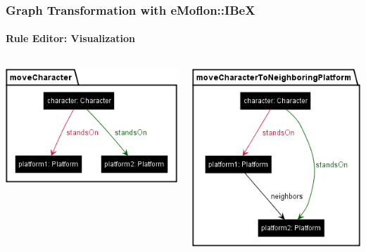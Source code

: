 	\begin{frame}
		\frametitle{Graph Transformation with eMoflon::IBeX}
		\framesubtitle{Rule Editor: Visualization}
		\begin{columns}
			\begin{column}{0.5\textwidth}
				\includegraphics[width=\linewidth]{../common/figures/rule-moveCharacter}
			\end{column}
			\begin{column}{0.5\textwidth}
				\includegraphics[width=\linewidth]{../common/figures/rule-moveCharacterToNeighboringPlatform}
			\end{column}
		\end{columns}
	\end{frame}

